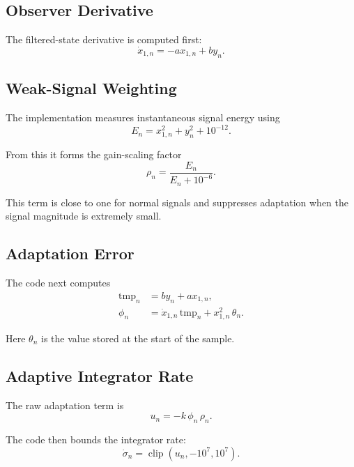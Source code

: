 \documentclass[conference]{IEEEtran}
\begin{document}
    \subsection{Observer Derivative}

    The filtered-state derivative is computed first:
    \begin{equation}
        \dot{x}_{1,n} = -a x_{1,n} + b y_n.
    \end{equation}

    \subsection{Weak-Signal Weighting}

    The implementation measures instantaneous signal energy using
    \begin{equation}
        E_n = x_{1,n}^2 + y_n^2 + 10^{-12}.
    \end{equation}

    From this it forms the gain-scaling factor
    \begin{equation}
        \rho_n = \frac{E_n}{E_n + 10^{-6}}.
    \end{equation}

    This term is close to one for normal signals and suppresses adaptation when
    the signal magnitude is extremely small.

    \subsection{Adaptation Error}

    The code next computes
    \begin{align}
        \text{tmp}_n &= b y_n + a x_{1,n},\\
        \phi_n &= \dot{x}_{1,n}\,\text{tmp}_n + x_{1,n}^2\,\theta_n.
    \end{align}

    Here $\theta_n$ is the value stored at the start of the sample.

    \subsection{Adaptive Integrator Rate}

    The raw adaptation term is
    \begin{equation}
        u_n = -k\,\phi_n\,\rho_n.
    \end{equation}

    The code then bounds the integrator rate:
    \begin{equation}
        \dot{\sigma}_n = \operatorname{clip}(u_n,-10^7,10^7).
    \end{equation}
\end{document}
